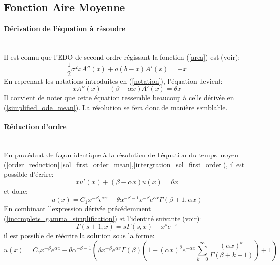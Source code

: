 \subsection{Fonction Aire Moyenne}

\paragraph{Dérivation de l'équation à résoudre}\phantom{}\\
Il est connu que l'\acs{EDO} de second ordre régissant la fonction (\ref{area}) est (voir\cite{abundo2013}): 
\[\frac{1}{2}\sigma^2xA''(x)+a(b-x)A'(x)=-x\]
En reprenant les notations introduites en (\ref{notation}), l'équation devient: 
\[xA''(x)+(\beta-\alpha x)A'(x)=\theta x\]
Il convient de noter que cette équation ressemble beaucoup à celle dérivée en (\ref{simplified_ode_mean}). La résolution se fera donc de manière semblable.
\paragraph{Réduction d'ordre}\phantom{}\\
En procédant de façon identique à la résolution de l'équation du temps moyen (\ref{order_reduction},\ref{sol_first_order_mean},\ref{intergration_sol_first_order}), il est possible d'écrire: 
\[xu'(x)+(\beta-\alpha x)u(x)=\theta x\]
et donc: 
\[u(x)=C_1x^{-\beta} e^{\alpha x} -\theta\alpha^{-\beta-1}x^{-\beta} e^{\alpha x}\Gamma(\beta+1, \alpha x)\]
En combinant l'expression dérivée précédemment (\ref{incomplete_gamma_simplification}) et l'identité suivante (voir\cite{NIST:DLMF}): 
\[\Gamma(s+1, x)=s\Gamma(s, x)+x^s e^{-x}\]
il est possible de réécrire la solution sous la forme: 
\[
u(x)=C_1x^{-\beta} e^{\alpha x} -\theta\alpha^{-\beta-1}\left(\beta x^{-\beta}e^{\alpha x}\Gamma(\beta)\left(1-{(\alpha x)}^\beta e^{-\alpha x}\sum_{k=0}^{\infty} \frac{{(\alpha x)}^k}{\Gamma(\beta+k+1)}\right)+1\right)
\]

